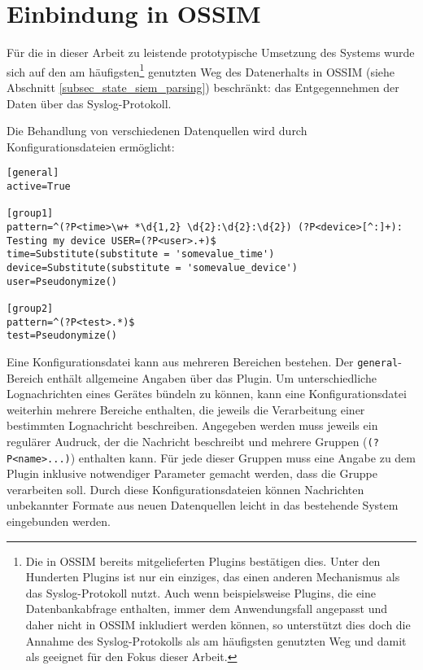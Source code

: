 \section{Einbindung in OSSIM}

\label{sec_impl_integration_into_ossim}

%
%
%
%



Für die in dieser Arbeit zu leistende prototypische Umsetzung des Systems wurde sich auf den am häufigsten\footnote{
  Die in OSSIM bereits mitgelieferten Plugins bestätigen dies. Unter den Hunderten Plugins ist nur ein einziges, das einen anderen Mechanismus als das Syslog-Protokoll nutzt. Auch wenn beispielsweise Plugins, die eine Datenbankabfrage enthalten, immer dem Anwendungsfall angepasst und daher nicht in OSSIM inkludiert werden können, so unterstützt dies doch die Annahme des Syslog-Protokolls als am häufigsten genutzten Weg und damit als geeignet für den Fokus dieser Arbeit.
} genutzten Weg des Datenerhalts in OSSIM (siehe Abschnitt \ref{subsec_state_siem_parsing}) beschränkt: das Entgegennehmen der Daten über das Syslog-Protokoll. 




Die Behandlung von verschiedenen Datenquellen wird durch Konfigurationsdateien ermöglicht:

\begin{lstlisting}[morekeywords={general,active,pattern,group1,group2}]
[general]
active=True

[group1]
pattern=^(?P<time>\w+ *\d{1,2} \d{2}:\d{2}:\d{2}) (?P<device>[^:]+): Testing my device USER=(?P<user>.+)$
time=Substitute(substitute = 'somevalue_time')
device=Substitute(substitute = 'somevalue_device')
user=Pseudonymize()

[group2]
pattern=^(?P<test>.*)$
test=Pseudonymize()
\end{lstlisting}

Eine Konfigurationsdatei kann aus mehreren Bereichen bestehen. Der \texttt{general}-Bereich enthält allgemeine Angaben über das Plugin. Um unterschiedliche Lognachrichten eines Gerätes bündeln zu können, kann eine Konfigurationsdatei weiterhin mehrere Bereiche enthalten, die jeweils die Verarbeitung einer bestimmten Lognachricht beschreiben. Angegeben werden muss jeweils ein regulärer Audruck, der die Nachricht beschreibt und mehrere Gruppen (\texttt{(?P<name>...)}) enthalten kann. Für jede dieser Gruppen muss eine Angabe zu dem Plugin inklusive notwendiger Parameter gemacht werden, dass die Gruppe verarbeiten soll. Durch diese Konfigurationsdateien können Nachrichten unbekannter Formate aus neuen Datenquellen leicht in das bestehende System eingebunden werden.



